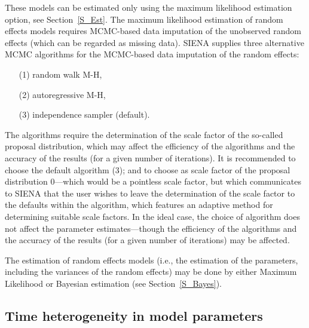 \documentclass[a4paper,fleqn,11pt]{article}
\newcommand{\+}{\, + \,}
\newcommand{\SI}{{\sf SIENA }}
\begin{document}
These models can be estimated only using the maximum likelihood
estimation option, see Section~\ref{S_Est}.
The maximum likelihood estimation of random effects models requires
MCMC-based data
imputation of the unobserved random effects (which can be regarded
as missing data).
\SI supplies three alternative MCMC algorithms for the MCMC-based
data imputation of the random effects:
\begin{itemize}
\item[(1)] random walk M-H,
\item[(2)] autoregressive M-H,
\item[(3)] independence sampler (default).
\end{itemize}
The algorithms require the determination of the scale factor of
the so-called proposal distribution,
which may affect the efficiency of the algorithms and
the accuracy of the results (for a given number of iterations).
It is recommended to choose the default algorithm (3);
and to choose as scale factor of the proposal distribution $0$---which
would be a pointless scale factor, but which communicates to \SI
that the user wishes to leave the determination of the scale factor to
the defaults within the algorithm,
which features an adaptive method for determining suitable scale factors.
In the ideal case, the choice of algorithm does not affect the
parameter estimates---though the efficiency of
the algorithms and the accuracy of the results
(for a given number of iterations) may be affected.

The estimation of random effects models
(i.e., the estimation of the parameters,
including the variances of the random effects)
may be done by either Maximum Likelihood
or Bayesian estimation (see Section~\ref{S_Bayes}).

\fi

\subsection{Time heterogeneity in model parameters}
\label{S_timetest1}
\end{document}
